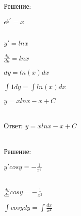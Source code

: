\documentclass{article}
\begin{document}
\begin{center}
    Решение:
\end{center}

\begin{flushleft}
    $e^{y'} = x$\\\\
\end{flushleft}


\begin{flushleft}
    $y' = lnx$
\end{flushleft}

\begin{flushleft}
    $\frac{dy}{du} = lnx$
\end{flushleft}

\begin{flushleft}
    $dy = ln(x)dx$
\end{flushleft}

\begin{flushleft}
   $\int1dy = \int ln(x)dx$
\end{flushleft}

\begin{flushleft}
   $y = xlnx - x + C$\\\\
\end{flushleft}

\begin{center}
    Ответ: $y = xlnx - x + C$\\\\
\end{center}

\begin{center}
\end{center}

\begin{center}
    Решение:
\end{center}

\begin{flushleft}
    $y'cosy = -\frac{1}{x^2}$\\\\
\end{flushleft}


\begin{flushleft}
    $\frac{dy}{dx}cosy = -\frac{1}{x^2}$
\end{flushleft}

\begin{flushleft}
    $\int cosydy = \int\frac{dx}{x^2}$
\end{flushleft}
\end{document}
